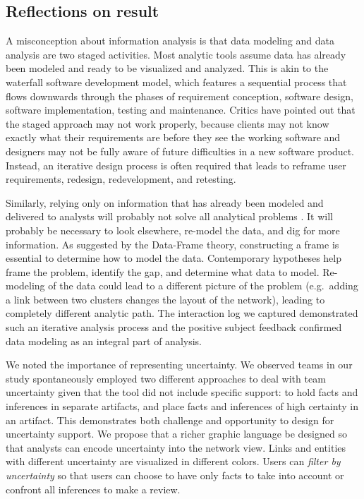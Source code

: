 \documentclass[]{article}
\begin{document}
\subsection{Reflections on result}\label{reflections-on-result}

A misconception about information analysis is that data modeling and
data analysis are two staged activities. Most analytic tools assume data
has already been modeled and ready to be visualized and analyzed. This
is akin to the waterfall software development model, which features a
sequential process that flows downwards through the phases of
requirement conception, software design, software implementation,
testing and maintenance. Critics have pointed out that the staged
approach may not work properly, because clients may not know exactly
what their requirements are before they see the working software and
designers may not be fully aware of future difficulties in a new
software product. Instead, an iterative design process is often required
that leads to reframe user requirements, redesign, redevelopment, and
retesting.

Similarly, relying only on information that has already been modeled and
delivered to analysts will probably not solve all analytical problems
\autocite{Heuer1999}. It will probably be necessary to look elsewhere,
re-model the data, and dig for more information. As suggested by the
Data-Frame theory, constructing a frame is essential to determine how to
model the data. Contemporary hypotheses help frame the problem, identify
the gap, and determine what data to model. Re-modeling of the data could
lead to a different picture of the problem (e.g.~adding a link between
two clusters changes the layout of the network), leading to completely
different analytic path. The interaction log we captured demonstrated
such an iterative analysis process and the positive subject feedback
confirmed data modeling as an integral part of analysis.

We noted the importance of representing uncertainty. We observed teams
in our study spontaneously employed two different approaches to deal
with team uncertainty given that the tool did not include specific
support: to hold facts and inferences in separate artifacts, and place
facts and inferences of high certainty in an artifact. This demonstrates
both challenge and opportunity to design for uncertainty support. We
propose that a richer graphic language be designed so that analysts can
encode uncertainty into the network view. Links and entities with
different uncertainty are visualized in different colors. Users can
\emph{filter by uncertainty} so that users can choose to have only facts
to take into account or confront all inferences to make a review.
\end{document}

